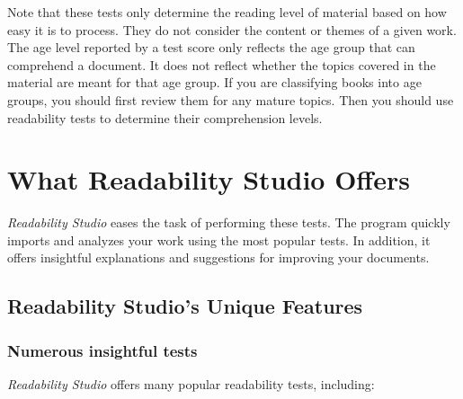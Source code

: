\documentclass[
]{book}
\theoremstyle{definition}
\theoremstyle{definition}
\theoremstyle{definition}
\theoremstyle{definition}
\theoremstyle{remark}
\begin{document}
Note that these tests only determine the reading level of material based on how easy it is to process. They do not consider the content or themes of a given work. The age level reported by a test score only reflects the age group that can comprehend a document. It does not reflect whether the topics covered in the material are meant for that age group. If you are classifying books into age groups, you should first review them for any mature topics. Then you should use readability tests to determine their comprehension levels.

\hypertarget{program-offering}{%
\section{What Readability Studio Offers}\label{program-offering}}

\emph{Readability Studio} eases the task of performing these tests. The program quickly imports and analyzes your work using the most popular tests. In addition, it offers insightful explanations and suggestions for improving your documents.

\hypertarget{program-unique-features}{%
\subsection*{Readability Studio's Unique Features}\label{program-unique-features}}

\hypertarget{numerous-insightful-tests}{%
\subsubsection*{Numerous insightful tests}\label{numerous-insightful-tests}}

\emph{Readability Studio} offers many popular readability tests, including:
\end{document}
